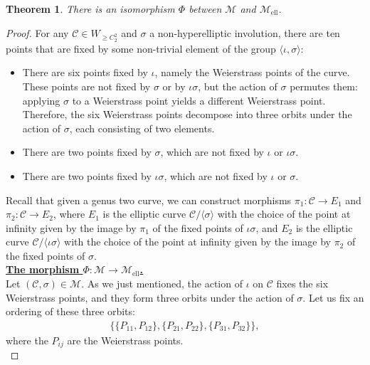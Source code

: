 \documentclass[10pt,a4paper]{amsart}
\newtheorem{theorem}{Theorem}
\newcommand{\calC}{\mathcal{C}}
\newcommand{\calM}{\mathcal{M}}
\newcommand{\mell}{\mathcal{M}_{\text{ell}}}
\begin{document}
\begin{theorem} \label{iso_theorem}
There is an isomorphism $\Phi$ between $\calM$ and $\mell$.
\end{theorem}

\begin{proof}
For any $\calC\in W_{\geq C_2^2}$ and $\sigma$ a non-hyperelliptic involution, there are ten points that are fixed by some non-trivial element of the group $\langle\iota,\sigma\rangle$:
\begin{itemize}
    \item There are six points fixed by $\iota$, namely the Weierstrass points of the curve.  These points are not fixed by $\sigma$ or by $\iota\sigma$, but the action of $\sigma$ permutes them: applying $\sigma$ to a Weierstrass point yields a different Weierstrass point. Therefore, the six Weierstrass points decompose into three orbits under the action of $\sigma$, each consisting of two elements.
    \item There are two points fixed by $\sigma$, which are not fixed by $\iota$ or $\iota\sigma$.
    \item There are two points fixed by $\iota\sigma$, which are not fixed by $\iota$ or $\sigma$.
\end{itemize}


Recall that given a genus two curve, we can construct morphisms $\pi_1:\calC\rightarrow E_1$ and $\pi_2:\calC\rightarrow E_2$, where $E_1$ is the elliptic curve $\calC/\langle\sigma\rangle$
with the choice of the point at infinity given by the image by $\pi_1$ of the fixed points of $\iota\sigma$, and $E_2$ is the elliptic curve $\calC/\langle\iota\sigma\rangle$
with the choice of the point at infinity given by the image by $\pi_2$ of the fixed points of $\sigma$.\\


\underline{\textbf{The morphism $\Phi:\calM\rightarrow\mell$.}}\\

Let $(\calC,\sigma)\in\calM$. As we just mentioned, the action of $\iota$ on $\calC$ fixes the six Weierstrass points, and they form three orbits under the action of $\sigma$. Let us fix an ordering of these three orbits: 
\begin{align*}
\{\{P_{11},P_{12}\},\{P_{21},P_{22}\},\{P_{31},P_{32}\}\},
\end{align*}
where the $P_{ij}$ are the Weierstrass points.\\


\end{proof}
\end{document}
